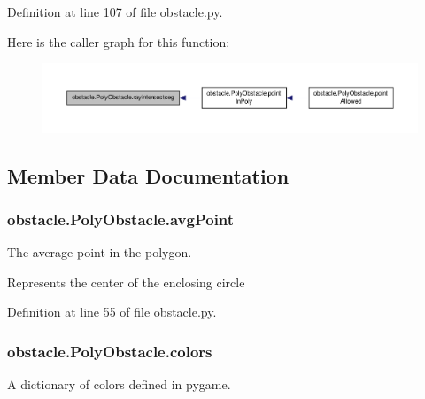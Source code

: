 Definition at line 107 of file obstacle.\-py.



Here is the caller graph for this function\-:\nopagebreak
\begin{figure}[H]
\begin{center}
\leavevmode
\includegraphics[width=350pt]{classobstacle_1_1PolyObstacle_a646f5fc4ba3e67c98c2313f4493b6a08_icgraph}
\end{center}
\end{figure}




\subsection{Member Data Documentation}
\hypertarget{classobstacle_1_1PolyObstacle_ae426e9296754e1ba96abcee3b86b3591}{
\subsubsection[{avg\-Point}]{\setlength{\rightskip}{0pt plus 5cm}obstacle.\-Poly\-Obstacle.\-avg\-Point}}\label{classobstacle_1_1PolyObstacle_ae426e9296754e1ba96abcee3b86b3591}


The average point in the polygon. 

Represents the center of the enclosing circle 

Definition at line 55 of file obstacle.\-py.

\hypertarget{classobstacle_1_1PolyObstacle_a73ce2986866adb38653645c5b84ec0ce}{
\subsubsection[{colors}]{\setlength{\rightskip}{0pt plus 5cm}obstacle.\-Poly\-Obstacle.\-colors}}\label{classobstacle_1_1PolyObstacle_a73ce2986866adb38653645c5b84ec0ce}


A dictionary of colors defined in pygame. 



